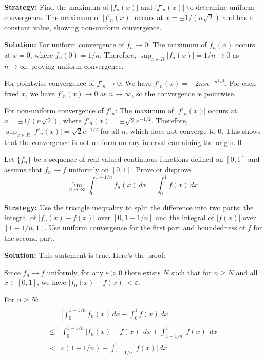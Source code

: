 \noindent\textbf{Strategy:} Find the maximum of \( |f_n(x)| \) and \( |f'_n(x)| \) to determine uniform convergence. The maximum of \( |f'_n(x)| \) occurs at \( x = \pm 1/(n\sqrt{2}) \) and has a constant value, showing non-uniform convergence.

\bigskip\noindent\textbf{Solution:} For uniform convergence of \( f_n \to 0 \): The maximum of \( f_n(x) \) occurs at \( x = 0 \), where \( f_n(0) = 1/n \). Therefore, \( \sup_{x \in R} |f_n(x)| = 1/n \to 0 \) as \( n \to \infty \), proving uniform convergence.

For pointwise convergence of \( f'_n \to 0 \): We have \( f'_n(x) = -2nxe^{-n^2x^2} \). For each fixed \( x \), we have \( f'_n(x) \to 0 \) as \( n \to \infty \), so the convergence is pointwise.

For non-uniform convergence of \( f'_n \): The maximum of \( |f'_n(x)| \) occurs at \( x = \pm 1/(n\sqrt{2}) \), where \( f'_n(x) = \pm \sqrt{2}e^{-1/2} \). Therefore, \( \sup_{x \in R} |f'_n(x)| = \sqrt{2}e^{-1/2} \) for all \( n \), which does not converge to 0. This shows that the convergence is not uniform on any interval containing the origin.\qed


\begin{problembox}
Let \(\{f_n\}\) be a sequence of real-valued continuous functions defined on \([0, 1]\) and assume that \( f_n \to f \) uniformly on \([0, 1]\). Prove or disprove
\[\lim_{n \to \infty} \int_0^{1 - 1/n} f_n(x) \, dx = \int_0^1 f(x) \, dx.\]
\end{problembox}

\noindent\textbf{Strategy:} Use the triangle inequality to split the difference into two parts: the integral of \( |f_n(x) - f(x)| \) over \([0, 1-1/n]\) and the integral of \( |f(x)| \) over \([1-1/n, 1]\). Use uniform convergence for the first part and boundedness of \( f \) for the second part.

\bigskip\noindent\textbf{Solution:} This statement is true. Here's the proof:

Since \( f_n \to f \) uniformly, for any \( \varepsilon > 0 \) there exists \( N \) such that for \( n \geq N \) and all \( x \in [0, 1] \), we have \( |f_n(x) - f(x)| < \varepsilon \).

For \( n \geq N \):
\begin{align*}
&\left|\int_0^{1 - 1/n} f_n(x) \, dx - \int_0^1 f(x) \, dx\right| \\
\leq & \int_0^{1 - 1/n} |f_n(x) - f(x)| \, dx + \int_{1 - 1/n}^1 |f(x)| \, dx \\
< & \varepsilon(1 - 1/n) + \int_{1 - 1/n}^1 |f(x)| \, dx.
\end{align*}

